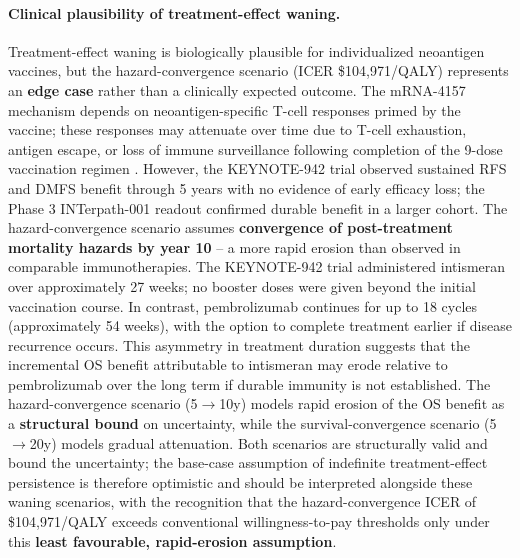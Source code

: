 \documentclass[12pt,a4paper]{article}
\begin{document}
\paragraph{Clinical plausibility of treatment-effect waning.} Treatment-effect waning is biologically plausible for individualized neoantigen vaccines, but the hazard-convergence scenario (ICER \$104,971/QALY) represents an \textbf{edge case} rather than a clinically expected outcome. The mRNA-4157 mechanism depends on neoantigen-specific T-cell responses primed by the vaccine; these responses may attenuate over time due to T-cell exhaustion, antigen escape, or loss of immune surveillance following completion of the 9-dose vaccination regimen \cite{keskin2019,hu2023}. However, the KEYNOTE-942 trial observed sustained RFS and DMFS benefit through 5 years with no evidence of early efficacy loss; the Phase 3 INTerpath-001 readout confirmed durable benefit in a larger cohort. The hazard-convergence scenario assumes \textbf{convergence of post-treatment mortality hazards by year 10} -- a more rapid erosion than observed in comparable immunotherapies. The KEYNOTE-942 trial administered intismeran over approximately 27 weeks; no booster doses were given beyond the initial vaccination course. In contrast, pembrolizumab continues for up to 18 cycles (approximately 54 weeks), with the option to complete treatment earlier if disease recurrence occurs. This asymmetry in treatment duration suggests that the incremental OS benefit attributable to intismeran may erode relative to pembrolizumab over the long term if durable immunity is not established. The hazard-convergence scenario (5$\to$10y) models rapid erosion of the OS benefit as a \textbf{structural bound} on uncertainty, while the survival-convergence scenario (5$\to$20y) models gradual attenuation. Both scenarios are structurally valid and bound the uncertainty; the base-case assumption of indefinite treatment-effect persistence is therefore optimistic and should be interpreted alongside these waning scenarios, with the recognition that the hazard-convergence ICER of \$104,971/QALY exceeds conventional willingness-to-pay thresholds only under this \textbf{least favourable, rapid-erosion assumption}.
\end{document}
